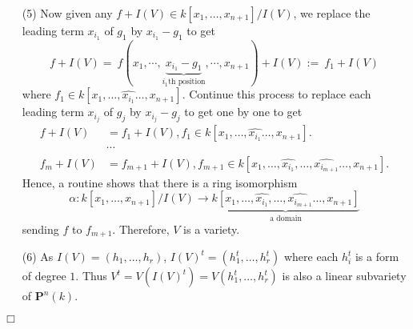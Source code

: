 \documentclass{article}
\begin{document}
\begin{enumerate}
\item[(5)]
  Now given any $f + I(V) \in k[x_1,\ldots,x_{n+1}]/I(V)$,
  we replace the leading term $x_{i_1}$ of $g_1$ by $x_{i_1} - g_1$ to get
  \[
    f + I(V)
    = \: f(x_1, \cdots,
      \underbrace{x_{i_1} - g_1}_{\text{$i_1$th position}}, \cdots, x_{n+1}) + I(V)
    := \: f_1 + I(V)
  \]
  where $f_1 \in k[x_1,\ldots,\widehat{x_{i_1}}\ldots,x_{n+1}]$.
  Continue this process to replace each leading term $x_{i_j}$ of $g_j$ by $x_{i_j} - g_j$ to get
  one by one to get
  \begin{align*}
    f + I(V) &= f_1 + I(V),
      f_1 \in k[x_1,\ldots,\widehat{x_{i_1}}\ldots,x_{n+1}]. \\
    & \cdots \\
    f_{m} + I(V) &= f_{m+1} + I(V),
      f_{m+1} \in k[x_1,\ldots,\widehat{x_{i_1}},\ldots,\widehat{x_{i_{m+1}}}\ldots,x_{n+1}].
  \end{align*}
  Hence, a routine shows that there is a ring isomorphism
  \[
    \alpha: k[x_1,\ldots,x_{n+1}]/I(V) \to
    \underbrace{
      k[x_1,\ldots,\widehat{x_{i_1}},\ldots,\widehat{x_{i_{m+1}}}\ldots,x_{n+1}]
    }_{\text{a domain}}
  \]
  sending $f$ to $f_{m+1}$.
  Therefore, $V$ is a variety.

\item[(6)]
  As $I(V) = (h_1, \ldots, h_r)$,
  $I(V)^{t} = (h_1^{t}, \ldots, h_r^{t})$ where each $h_i^{t}$ is a form of degree $1$.
  Thus $V^{t} = V(I(V)^{t}) = V(h_1^{t}, \ldots, h_r^{t})$
  is also a linear subvariety of $\mathbf{P}^n(k)$.
\end{enumerate}
$\Box$ \\
\end{document}
